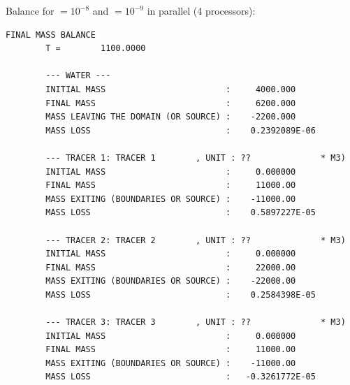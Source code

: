Balance for  $= 10^{-8}$ and
 $= 10^{-9}$ in parallel
(4 processors):
%
\begin{lstlisting}[language=TelFortran]
                        FINAL MASS BALANCE
        T =        1100.0000

        --- WATER ---
        INITIAL MASS                        :     4000.000
        FINAL MASS                          :     6200.000
        MASS LEAVING THE DOMAIN (OR SOURCE) :    -2200.000
        MASS LOSS                           :    0.2392089E-06

        --- TRACER 1: TRACER 1        , UNIT : ??              * M3)
        INITIAL MASS                        :     0.000000
        FINAL MASS                          :     11000.00
        MASS EXITING (BOUNDARIES OR SOURCE) :    -11000.00
        MASS LOSS                           :    0.5897227E-05

        --- TRACER 2: TRACER 2        , UNIT : ??              * M3)
        INITIAL MASS                        :     0.000000
        FINAL MASS                          :     22000.00
        MASS EXITING (BOUNDARIES OR SOURCE) :    -22000.00
        MASS LOSS                           :    0.2584398E-05

        --- TRACER 3: TRACER 3        , UNIT : ??              * M3)
        INITIAL MASS                        :     0.000000
        FINAL MASS                          :     11000.00
        MASS EXITING (BOUNDARIES OR SOURCE) :    -11000.00
        MASS LOSS                           :   -0.3261772E-05
\end{lstlisting}

